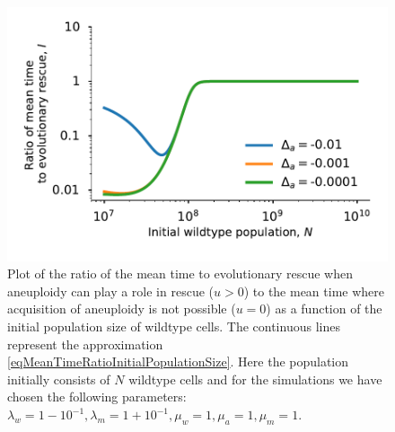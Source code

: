 \documentclass[12pt]{extarticle}
\begin{document}
\begin{figure}[p]
 \vspace*{1\baselineskip}
\includegraphics[width=1\textwidth]{Figures/MeanTimeRatioInitialPopulationSize.pdf}
\caption{Plot of the ratio of the mean time to evolutionary rescue when aneuploidy can play a role in rescue ($u>0$) to the mean time where acquisition of aneuploidy is not possible ($u=0$) as a function of the initial population size of wildtype cells. The continuous lines represent the approximation \eqref{eqMeanTimeRatioInitialPopulationSize}.  Here the population initially consists of $N$ wildtype cells and for the simulations we have chosen the following parameters: $\lambda_w=1-10^{-1},\lambda_m=1+10^{-1},\mu_w=1,\mu_a=1,\mu_m=1$.}
\label{MeanTimeRatioInitialPopulationSize}
\end{figure}
\end{document}

